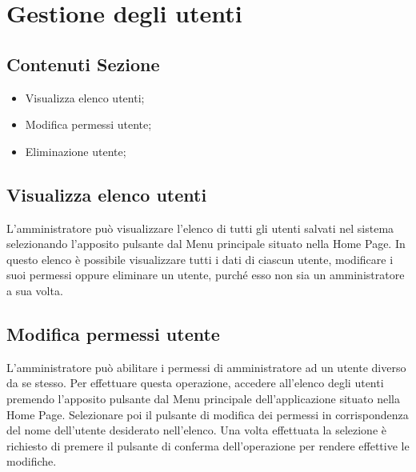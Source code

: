 %

\section{Gestione degli utenti} %
\label{sec:gestione_utenti}
	\subsection{Contenuti Sezione} %
	\label{sub:contenuti_sezione}
	\begin{itemize}
		\item Visualizza elenco utenti;
		\item Modifica permessi utente;
		\item Eliminazione utente;
	\end{itemize}

	\subsection{Visualizza elenco utenti}
	L'amministratore può visualizzare l'elenco di tutti gli utenti salvati nel sistema selezionando l'apposito pulsante dal Menu principale situato nella Home Page.
	In questo elenco è possibile visualizzare tutti i dati di ciascun utente, modificare  i suoi permessi oppure eliminare un utente, purché esso non sia un amministratore a sua volta.
	
	\subsection{Modifica permessi utente}
	L'amministratore può abilitare i permessi di amministratore ad un utente diverso da se stesso.
	Per effettuare questa operazione, accedere all'elenco degli utenti premendo l'apposito pulsante dal Menu principale dell'applicazione situato nella Home Page.
	Selezionare poi il pulsante di modifica dei permessi in corrispondenza del nome dell'utente desiderato nell'elenco.
	Una volta effettuata la selezione è richiesto di premere il pulsante di conferma dell'operazione per rendere effettive le modifiche.
	
